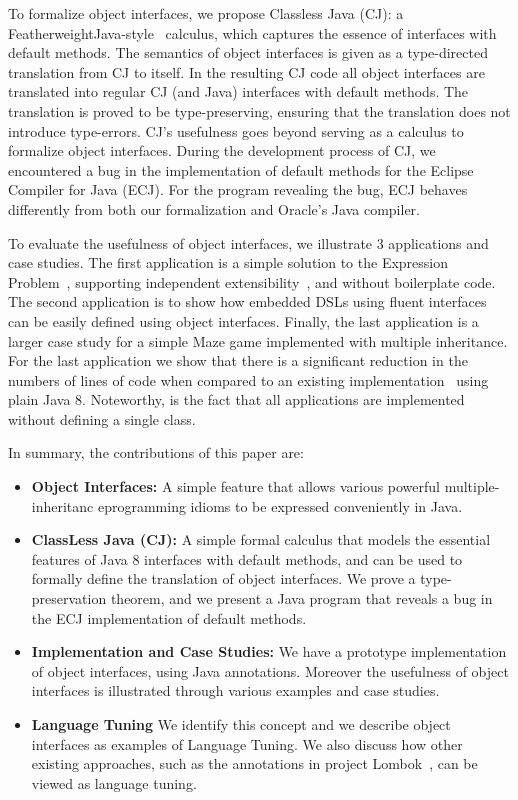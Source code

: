 To formalize object interfaces, we propose Classless Java (CJ): a
FeatherweightJava-style~\cite{Igarashi01FJ} calculus, which captures the essence
of interfaces with default methods. The semantics of object interfaces
is given as a type-directed translation from CJ to itself. In the
resulting CJ code all object interfaces are translated into regular CJ
(and Java) interfaces with default methods. The translation is proved
to be type-preserving, ensuring that the translation does not
introduce type-errors. CJ's usefulness goes beyond serving as a
calculus to formalize object interfaces. During the development
process of CJ, we encountered a bug in the implementation of default
methods for the Eclipse Compiler for Java (ECJ). For the program revealing the 
bug, ECJ behaves differently from both our formalization and Oracle's 
Java compiler.

To evaluate the usefulness of object interfaces, we illustrate 3
applications and case studies. The first application is a simple 
solution to the Expression Problem~\cite{wadler98expression}, supporting independent 
extensibility~\cite{zenger05independentlyextensible}, and without boilerplate code. The second
application is to show how embedded DSLs using fluent interfaces~\cite{fowler2005fluentinterface} 
can be easily defined using object interfaces. Finally, the last
application is a larger case study for a simple Maze game implemented with 
multiple inheritance. For the last application we show that there is a
significant reduction in the numbers of lines of code when compared 
to an existing implementation~\cite{bono14} using plain Java 8. 
Noteworthy, is the fact that all applications are implemented 
without defining a single class.

In summary, the contributions of this paper are:

\begin{itemize}

\item {\bf Object Interfaces:} A simple feature that allows various
  powerful multiple-inheritanc eprogramming idioms to be expressed
  conveniently in Java.

\item {\bf ClassLess Java (CJ):} A simple formal calculus that models 
the essential features of Java 8 interfaces with default methods, and 
can be used to formally define the translation of object interfaces. 
We prove a type-preservation theorem, and we present a Java program 
that reveals a bug in the ECJ implementation of default methods.

\item {\bf Implementation and Case Studies:} We have a prototype
  implementation of object interfaces, using Java
  annotations. Moreover the usefulness of object interfaces is
  illustrated through various examples and case studies.

\item{\bf Language Tuning} We identify this concept and we describe
object interfaces as examples of Language Tuning. We also discuss 
how other existing approaches, such as the annotations in project 
Lombok~\cite{lombok}, can be viewed as language tuning.

\end{itemize}
